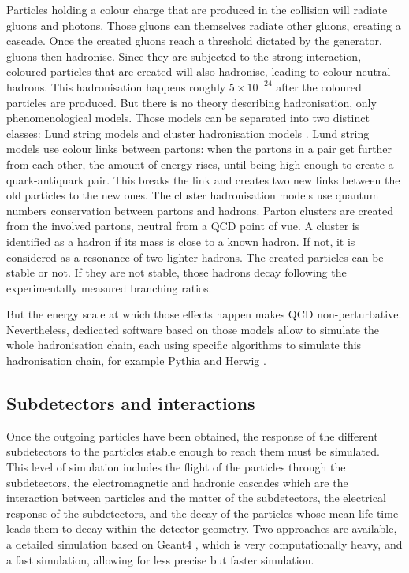 Particles holding a colour charge that are produced in the collision will radiate gluons and photons. Those gluons can themselves radiate other gluons, creating a cascade. Once the created gluons reach a threshold dictated by the generator, gluons then hadronise. Since they are subjected to the strong interaction, coloured particles that are created will also hadronise, leading to colour-neutral hadrons. This hadronisation happens roughly $5 \times 10^{-24}$ after the coloured particles are produced. But there is no theory describing hadronisation, only phenomenological models. Those models can be separated into two distinct classes: Lund string models \cite{1983PhR....97...31A} and cluster hadronisation models \cite{Winter2004}. Lund string models use colour links between partons: when the partons in a pair get further from each other, the amount of energy rises, until being high enough to create a quark-antiquark pair. This breaks the link and creates two new links between the old particles to the new ones. The cluster hadronisation models use quantum numbers conservation between partons and hadrons. Parton clusters are created from the involved partons, neutral from a QCD point of vue. A cluster is identified as a hadron if its mass is close to a known hadron. If not, it is considered as a resonance of two lighter hadrons. The created particles can be stable or not. If they are not stable, those hadrons decay following the experimentally measured branching ratios.

But the energy scale at which those effects happen makes QCD non-perturbative. Nevertheless, dedicated software based on those models allow to simulate the whole hadronisation chain, each using specific algorithms to simulate this hadronisation chain, for example Pythia \cite{SJOSTRAND2008852} and Herwig \cite{Bellm2016}.

\subsection{Subdetectors and interactions}

Once the outgoing particles have been obtained, the response of the different subdetectors to the particles stable enough to reach them must be simulated. This level of simulation includes the flight of the particles through the subdetectors, the electromagnetic and hadronic cascades which are the interaction between particles and the matter of the subdetectors, the electrical response of the subdetectors, and the decay of the particles whose mean life time leads them to decay within the detector geometry. Two approaches are available, a detailed simulation based on Geant4 \cite{AGOSTINELLI2003250}, which is very computationally heavy, and a fast simulation, allowing for less precise but faster simulation.

